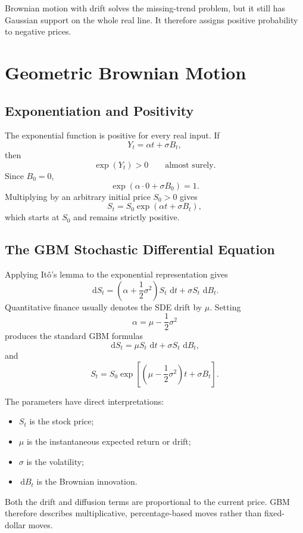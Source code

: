 \documentclass[12pt,openany]{book}
\theoremstyle{definition}
\theoremstyle{remark}
\newcommand{\dd}{\,\mathrm{d}}
\begin{document}
Brownian motion with drift solves the missing-trend problem, but it still has
Gaussian support on the whole real line. It therefore assigns positive
probability to negative prices.

\section{Geometric Brownian Motion}

\subsection{Exponentiation and Positivity}

The exponential function is positive for every real input. If
\[
Y_t=\alpha t+\sigma B_t,
\]
then
\[
\exp(Y_t)>0
\qquad\text{almost surely.}
\]
Since \(B_0=0\),
\[
\exp(\alpha\cdot0+\sigma B_0)=1.
\]
Multiplying by an arbitrary initial price \(S_0>0\) gives
\[
\boxed{
S_t=S_0\exp(\alpha t+\sigma B_t),
}
\]
which starts at \(S_0\) and remains strictly positive.

\subsection{The GBM Stochastic Differential Equation}

Applying It\^o's lemma to the exponential representation gives
\[
\dd S_t
=\left(\alpha+\frac12\sigma^2\right)S_t\,\dd t
+\sigma S_t\,\dd B_t.
\]
Quantitative finance usually denotes the SDE drift by \(\mu\). Setting
\[
\alpha=\mu-\frac12\sigma^2
\]
produces the standard GBM formulas
\[
\boxed{
\dd S_t=\mu S_t\,\dd t+\sigma S_t\,\dd B_t,
}
\]
and
\[
\boxed{
S_t
=S_0\exp\!\left[
\left(\mu-\frac12\sigma^2\right)t+\sigma B_t
\right].
}
\]

The parameters have direct interpretations:
\begin{itemize}
    \item \(S_t\) is the stock price;
    \item \(\mu\) is the instantaneous expected return or drift;
    \item \(\sigma\) is the volatility;
    \item \(\dd B_t\) is the Brownian innovation.
\end{itemize}

Both the drift and diffusion terms are proportional to the current price.
GBM therefore describes multiplicative, percentage-based moves rather than
fixed-dollar moves.
\end{document}

